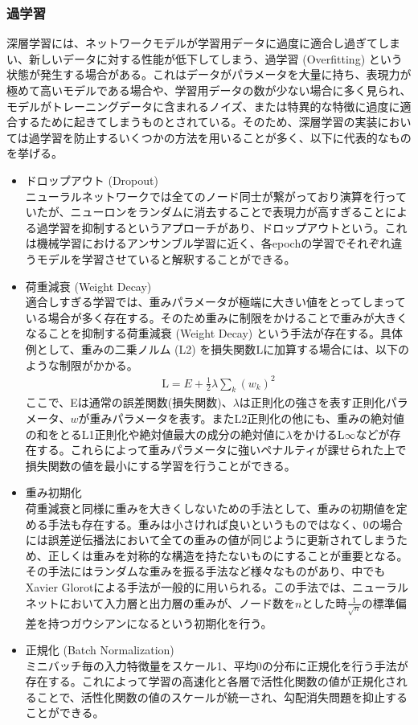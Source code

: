 \subsubsection{過学習}
深層学習には、ネットワークモデルが学習用データに過度に適合し過ぎてしまい、新しいデータに対する性能が低下してしまう、過学習 (Overfitting) という状態が発生する場合がある。これはデータがパラメータを大量に持ち、表現力が極めて高いモデルである場合や、学習用データの数が少ない場合に多く見られ、モデルがトレーニングデータに含まれるノイズ、または特異的な特徴に過度に適合するために起きてしまうものとされている。そのため、深層学習の実装においては過学習を防止するいくつかの方法を用いることが多く、以下に代表的なものを挙げる。
\begin{itemize}
\item ドロップアウト (Dropout)\\
ニューラルネットワークでは全てのノード同士が繋がっており演算を行っていたが、ニューロンをランダムに消去することで表現力が高すぎることによる過学習を抑制するというアプローチがあり、ドロップアウトという。これは機械学習におけるアンサンブル学習に近く、各epochの学習でそれぞれ違うモデルを学習させていると解釈することができる。
\item 荷重減衰 (Weight Decay)\\
適合しすぎる学習では、重みパラメータが極端に大きい値をとってしまっている場合が多く存在する。そのため重みに制限をかけることで重みが大きくなることを抑制する荷重減衰 (Weight Decay) という手法が存在する。具体例として、重みの二乗ノルム (L2) を損失関数$\mathrm{L}$に加算する場合には、以下のような制限がかかる。
\begin{align}
\mathrm{L} = E + \frac{1}{2}\lambda \sum_k {(w_k)}^2
\end{align}
ここで、Eは通常の誤差関数(損失関数)、$\lambda$は正則化の強さを表す正則化パラメータ、$w$が重みパラメータを表す。またL2正則化の他にも、重みの絶対値の和をとるL1正則化や絶対値最大の成分の絶対値に$\lambda$をかけるL$\infty$などが存在する。これらによって重みパラメータに強いペナルティが課せられた上で損失関数の値を最小にする学習を行うことができる。
\item 重み初期化\\
荷重減衰と同様に重みを大きくしないための手法として、重みの初期値を定める手法も存在する。重みは小さければ良いというものではなく、0の場合には誤差逆伝播法において全ての重みの値が同じように更新されてしまうため、正しくは重みを対称的な構造を持たないものにすることが重要となる。その手法にはランダムな重みを振る手法など様々なものがあり、中でもXavier Glorotによる手法が一般的に用いられる。この手法では、ニューラルネットにおいて入力層と出力層の重みが、ノード数を$n$とした時$\frac{1}{\sqrt{n}}$の標準偏差を持つガウシアンになるという初期化を行う。
\item 正規化 (Batch Normalization)\\
ミニバッチ毎の入力特徴量をスケール1、平均0の分布に正規化を行う手法が存在する。これによって学習の高速化と各層で活性化関数の値が正規化されることで、活性化関数の値のスケールが統一され、勾配消失問題を抑止することができる。
\end{itemize}
